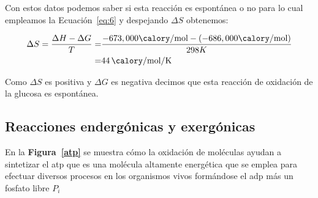 Con estos datos podemos saber si esta reacci\'on es espont\'anea o no para lo cual empleamos
la Ecuaci\'on~\ref{eq:6} y despejando $\Delta S$ obtenemos:

\begin{eqnarray*}
\Delta S = \frac{\Delta H-\Delta G}{T} =
&\frac{-673,000 \si{\calory\per\mole}-( -686,000 \si{\calory\per\mole})}{298K}\\
=& \SI{44}{\calory\per\mole\per\kelvin}
\end{eqnarray*}

Como $\Delta S$ es positiva y $\Delta G$ es negativa decimos que esta reacci\'on de oxidaci\'on de la glucosa es espont\'anea.

\subsection{Reacciones enderg\'onicas y exerg\'onicas}
En la \textbf{Figura~\ref{atp}} se muestra c\'omo la oxidaci\'on de mol\'eculas ayudan a sintetizar el
\gls{atp} que es una mol\'ecula altamente energ\'etica que se emplea para efectuar
diversos procesos en los organismos vivos form\'andose el \gls{adp} m\'as un
fosfato libre $P_i$

